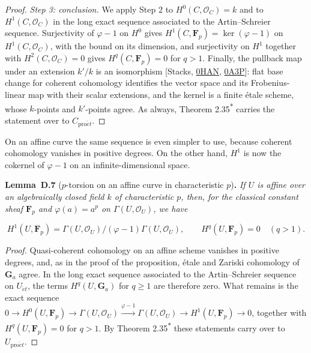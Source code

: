 \documentclass[11pt]{article}
\newenvironment{bpstatement}[2]{\par\addvspace{0.6\baselineskip}\noindent\textbf{#1}#2\textbf{.}\enspace\ignorespaces}
  {\par\addvspace{0.4\baselineskip}}
\newenvironment{bpstatementit}[2]{\begin{bpstatement}{#1}{#2}\itshape\ignorespaces}{\end{bpstatement}}
\newcommand{\bpout}[1]{#1\textsuperscript{\hyperlink{bp-outside}{\ensuremath{\ast}}}}
\begin{document}
\begin{proof}[{Proof}]
\emph{Step 3: conclusion.} We apply Step 2 to \(H^0(C,\mathcal O_C)=k\) and to \(H^1(C,\mathcal O_C)\) in the long exact sequence associated to the Artin–Schreier sequence. Surjectivity of \(\varphi-1\) on \(H^0\) gives \(H^1(C,\mathbf F_p)=\ker(\varphi-1)\) on \(H^1(C,\mathcal O_C)\), with the bound on its dimension, and surjectivity on \(H^1\) together with \(H^2(C,\mathcal O_C)=0\) gives \(H^q(C,\mathbf F_p)=0\) for \(q>1\). Finally, the pullback map under an extension \(k'/k\) is an isomorphism [Stacks, \href{https://stacks.math.columbia.edu/tag/0HAN}{0HAN}, \href{https://stacks.math.columbia.edu/tag/0A3P}{0A3P}]: flat base change for coherent cohomology identifies the vector space and its Frobenius-linear map with their scalar extensions, and the kernel is a finite étale scheme, whose \(k\)-points and \(k'\)-points agree. As always, Theorem \bpout{2.35} carries the statement over to \(C_{\mathrm{pro}\acute{e}t}\).
\end{proof}

\label{bp193}%
On an affine curve the same sequence is even simpler to use, because coherent cohomology vanishes in positive degrees. On the other hand, \(H^1\) is now the cokernel of \(\varphi-1\) on an infinite-dimensional space.

\label{bp194}%
\begin{bpstatementit}{Lemma~D.7}{ ($p$-torsion on an affine curve in characteristic $p$)}
If \(U\) is affine over an algebraically closed field \(k\) of characteristic \(p\), then, for the classical constant sheaf \(\mathbf F_p\) and \(\varphi(a)=a^p\) on \(\Gamma(U,\mathcal O_U)\), we have

\[
H^1(U,\mathbf F_p)=
\Gamma(U,\mathcal O_U)/(\varphi-1)\Gamma(U,\mathcal O_U),\qquad
H^q(U,\mathbf F_p)=0\quad(q>1).
\]
\end{bpstatementit}

\begin{proof}[{Proof}]\label{bp195}%
Quasi-coherent cohomology on an affine scheme vanishes in positive degrees, and, as in the proof of the proposition, étale and Zariski cohomology of \(\mathbf G_a\) agree. In the long exact sequence associated to the Artin–Schreier sequence on \(U_{\acute{e}t}\), the terms \(H^q(U,\mathbf G_a)\) for \(q\geq1\) are therefore zero. What remains is the exact sequence \(0\to H^0(U,\mathbf F_p)\to\Gamma(U,\mathcal O_U)\xrightarrow{\varphi-1}\Gamma(U,\mathcal O_U)\to H^1(U,\mathbf F_p)\to0\), together with \(H^q(U,\mathbf F_p)=0\) for \(q>1\).  By Theorem \bpout{2.35} these statements carry over to \(U_{\mathrm{pro}\acute{e}t}\).
\end{proof}
\end{document}
